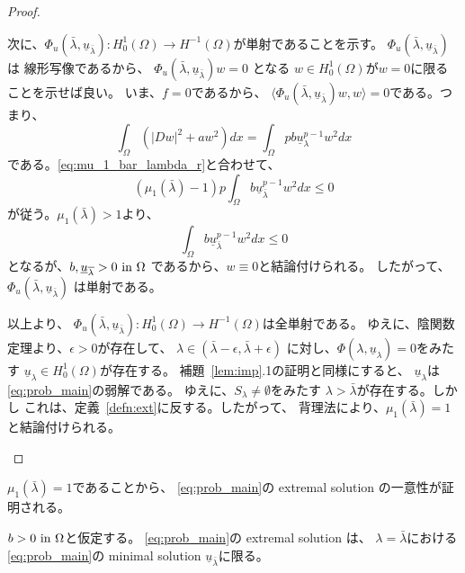 \begin{proof}
\begin{enumerate}[1.]
        次に、$\Phi_u (\bar{\lambda}, \underline{u}_{\bar{\lambda}}) \colon
        H_0^1(\Omega) \to H^{-1}(\Omega)$が単射であることを示す。
        $\Phi_u (\bar{\lambda}, \underline{u}_{\bar{\lambda}})$は
        線形写像であるから、
        $\Phi_u (\bar{\lambda}, \underline{u}_{\bar{\lambda}})w = 0$
        となる
        $w \in H_0^1(\Omega)$が$w = 0$に限ることを示せば良い。
        いま、$f = 0$であるから、
        $\langle \Phi_u (\bar{\lambda},
        \underline{u}_{\bar{\lambda}})w , w \rangle = 0$である。つまり、
        \[
         \int_\Omega \left( \lvert Dw \rvert^2 + aw^2 \right)dx =
        \int_\Omega p b\underline{u}_\lambda^{p-1} w^2 dx
        \]
        である。\eqref{eq:mu_1_bar_lambda_r}と合わせて、
        \[
         \left( \mu_1(\bar{\lambda}) - 1 \right) p \int_\Omega b
        \underline{u}_{\bar{\lambda}}^{p-1} w^2 dx \leq 0
        \]
        が従う。$\mu_1 ( \bar{\lambda}) > 1$より、
        \[
         \int_\Omega b
        \underline{u}_{\bar{\lambda}}^{p-1} w^2 dx \leq 0 
        \]
        となるが、$b , \underline{u}_{\overline{\lambda}} > 0 ~\text{in}~ \Omega$
        であるから、$w \equiv 0$と結論付けられる。
        したがって、
        $\Phi_u (\bar{\lambda}, \underline{u}_{\bar{\lambda}})$
        は単射である。

        以上より、
        $\Phi_u (\bar{\lambda}, \underline{u}_{\bar{\lambda}}) \colon
        H_0^1(\Omega) \to H^{-1}(\Omega)$は全単射である。
        ゆえに、陰関数定理より、$\epsilon > 0$が存在して、
        $\lambda \in (\bar{\lambda} - \epsilon, \bar{\lambda} +
        \epsilon)$
        に対し、$\Phi (\lambda, \underline{u}_{\lambda}) = 0$をみたす
        $\underline{u}_\lambda \in H_0^1(\Omega)$が存在する。
        補題~\ref{lem:imp}.1の証明と同様にすると、
        $\underline{u}_\lambda$は\ref{eq:prob_main}の弱解である。
        ゆえに、$S_\lambda \neq \emptyset$をみたす
        $\lambda > \bar{\lambda}$が存在する。しかし
        これは、定義~\ref{defn:ext}に反する。したがって、
        背理法により、$\mu_1(\bar{\lambda}) = 1$と結論付けられる。
 \end{enumerate}
\end{proof}

$\mu_1(\bar{\lambda}) = 1$であることから、
\ref{eq:prob_main}の extremal solution の一意性が証明される。

\begin{prop} \label{prop:ext_uni}
 $b > 0 ~\text{in}~ \Omega$と仮定する。
 \ref{eq:prob_main}の extremal solution は、
 $\lambda = \bar{\lambda}$における\ref{eq:prob_main}の minimal
 solution $\underline{u}_{\bar{\lambda}}$に限る。
\end{prop}

